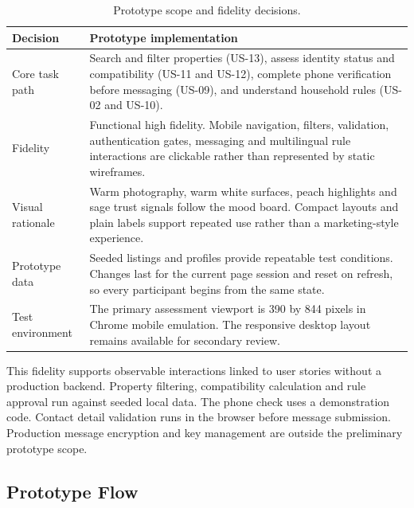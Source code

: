 \documentclass[11pt,a4paper]{article}
\begin{document}
\begin{table}[H]
    \centering
    \small
    \caption{Prototype scope and fidelity decisions.}
    \begin{tabularx}{\textwidth}{@{}L{3.2cm}Y@{}}
        \toprule
        Decision & Prototype implementation\\
        \midrule
        Core task path & Search and filter properties (US-13), assess identity status and compatibility (US-11 and US-12), complete phone verification before messaging (US-09), and understand household rules (US-02 and US-10).\\
        Fidelity & Functional high fidelity. Mobile navigation, filters, validation, authentication gates, messaging and multilingual rule interactions are clickable rather than represented by static wireframes.\\
        Visual rationale & Warm photography, warm white surfaces, peach highlights and sage trust signals follow the mood board. Compact layouts and plain labels support repeated use rather than a marketing-style experience.\\
        Prototype data & Seeded listings and profiles provide repeatable test conditions. Changes last for the current page session and reset on refresh, so every participant begins from the same state.\\
        Test environment & The primary assessment viewport is 390 by 844 pixels in Chrome mobile emulation. The responsive desktop layout remains available for secondary review.\\
        \bottomrule
    \end{tabularx}
    \label{tabprototypescope}
\end{table}

This fidelity supports observable interactions linked to user stories without a production backend. Property filtering, compatibility calculation and rule approval run against seeded local data. The phone check uses a demonstration code. Contact detail validation runs in the browser before message submission. Production message encryption and key management are outside the preliminary prototype scope.

\subsection{Prototype Flow}
\end{document}
